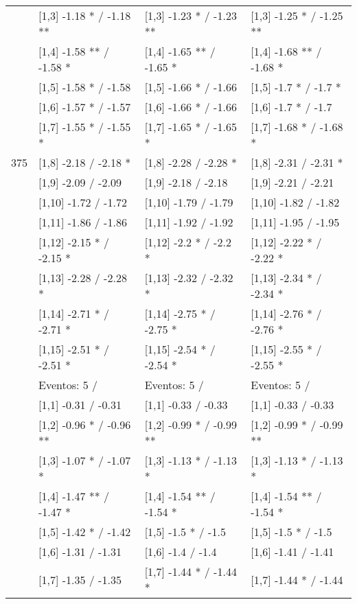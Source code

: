 \begin{table}
\begin{tabular}[t]{llll}
 & {}[1,3] -1.18 * / -1.18 ** & {}[1,3] -1.23 * / -1.23 ** & {}[1,3] -1.25 * / -1.25 **\\
\addlinespace
 & {}[1,4] -1.58 ** / -1.58 * & {}[1,4] -1.65 ** / -1.65 * & {}[1,4] -1.68 ** / -1.68 *\\
 & {}[1,5] -1.58 * / -1.58 & {}[1,5] -1.66 * / -1.66 & {}[1,5] -1.7 * / -1.7 *\\
 & {}[1,6] -1.57 * / -1.57 & {}[1,6] -1.66 * / -1.66 & {}[1,6] -1.7 * / -1.7\\
 & {}[1,7] -1.55 * / -1.55 * & {}[1,7] -1.65 * / -1.65 * & {}[1,7] -1.68 * / -1.68 *\\
375 & {}[1,8] -2.18  / -2.18 * & {}[1,8] -2.28  / -2.28 * & {}[1,8] -2.31  / -2.31 *\\
\addlinespace
 & {}[1,9] -2.09  / -2.09 & {}[1,9] -2.18  / -2.18 & {}[1,9] -2.21  / -2.21\\
 & {}[1,10] -1.72  / -1.72 & {}[1,10] -1.79  / -1.79 & {}[1,10] -1.82  / -1.82\\
 & {}[1,11] -1.86  / -1.86 & {}[1,11] -1.92  / -1.92 & {}[1,11] -1.95  / -1.95\\
 & {}[1,12] -2.15 * / -2.15 * & {}[1,12] -2.2 * / -2.2 * & {}[1,12] -2.22 * / -2.22 *\\
 & {}[1,13] -2.28  / -2.28 * & {}[1,13] -2.32  / -2.32 * & {}[1,13] -2.34 * / -2.34 *\\
\addlinespace
 & {}[1,14] -2.71 * / -2.71 * & {}[1,14] -2.75 * / -2.75 * & {}[1,14] -2.76 * / -2.76 *\\
 & {}[1,15] -2.51 * / -2.51 * & {}[1,15] -2.54 * / -2.54 * & {}[1,15] -2.55 * / -2.55 *\\
 & Eventos:  5 / & Eventos:  5 / & Eventos:  5 /\\
 & {}[1,1] -0.31  / -0.31 & {}[1,1] -0.33  / -0.33 & {}[1,1] -0.33  / -0.33\\
 & {}[1,2] -0.96 * / -0.96 ** & {}[1,2] -0.99 * / -0.99 ** & {}[1,2] -0.99 * / -0.99 **\\
\addlinespace
 & {}[1,3] -1.07 * / -1.07 * & {}[1,3] -1.13 * / -1.13 * & {}[1,3] -1.13 * / -1.13 *\\
 & {}[1,4] -1.47 ** / -1.47 * & {}[1,4] -1.54 ** / -1.54 * & {}[1,4] -1.54 ** / -1.54 *\\
 & {}[1,5] -1.42 * / -1.42 & {}[1,5] -1.5 * / -1.5 & {}[1,5] -1.5 * / -1.5\\
 & {}[1,6] -1.31  / -1.31 & {}[1,6] -1.4  / -1.4 & {}[1,6] -1.41  / -1.41\\
 & {}[1,7] -1.35  / -1.35 & {}[1,7] -1.44 * / -1.44 * & {}[1,7] -1.44 * / -1.44\\

\end{tabular}
\end{table}
